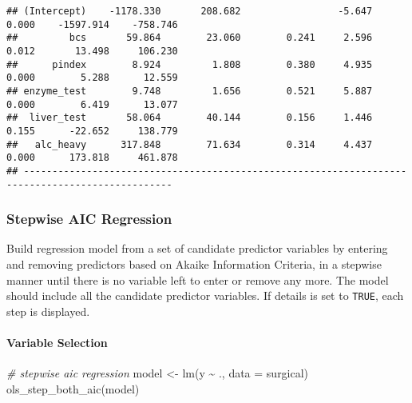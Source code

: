 \documentclass[
]{article}
\newenvironment{Shaded}{\begin{snugshade}}{\end{snugshade}}
\newcommand{\AttributeTok}[1]{\textcolor[rgb]{0.77,0.63,0.00}{#1}}
\newcommand{\CommentTok}[1]{\textcolor[rgb]{0.56,0.35,0.01}{\textit{#1}}}
\newcommand{\FunctionTok}[1]{\textcolor[rgb]{0.00,0.00,0.00}{#1}}
\newcommand{\NormalTok}[1]{#1}
\newcommand{\OtherTok}[1]{\textcolor[rgb]{0.56,0.35,0.01}{#1}}
\newcommand{\SpecialCharTok}[1]{\textcolor[rgb]{0.00,0.00,0.00}{#1}}
\begin{document}
\begin{verbatim}
## (Intercept)    -1178.330       208.682                 -5.647    0.000    -1597.914    -758.746 
##         bcs       59.864        23.060        0.241     2.596    0.012       13.498     106.230 
##      pindex        8.924         1.808        0.380     4.935    0.000        5.288      12.559 
## enzyme_test        9.748         1.656        0.521     5.887    0.000        6.419      13.077 
##  liver_test       58.064        40.144        0.156     1.446    0.155      -22.652     138.779 
##   alc_heavy      317.848        71.634        0.314     4.437    0.000      173.818     461.878 
## ------------------------------------------------------------------------------------------------
\end{verbatim}

\hypertarget{stepwise-aic-regression}{%
\subsubsection{Stepwise AIC Regression}\label{stepwise-aic-regression}}

Build regression model from a set of candidate predictor variables by
entering and removing predictors based on Akaike Information Criteria,
in a stepwise manner until there is no variable left to enter or remove
any more. The model should include all the candidate predictor
variables. If details is set to \texttt{TRUE}, each step is displayed.

\hypertarget{variable-selection-6}{%
\paragraph{Variable Selection}\label{variable-selection-6}}

\begin{Shaded}
\begin{Highlighting}[]
\CommentTok{\# stepwise aic regression}
\NormalTok{model }\OtherTok{\textless{}{-}} \FunctionTok{lm}\NormalTok{(y }\SpecialCharTok{\textasciitilde{}}\NormalTok{ ., }\AttributeTok{data =}\NormalTok{ surgical)}
\FunctionTok{ols\_step\_both\_aic}\NormalTok{(model)}
\end{Highlighting}
\end{Shaded}
\end{document}
